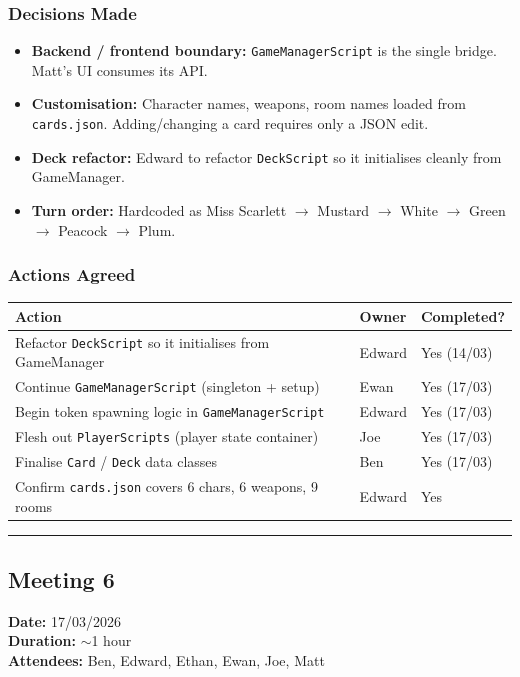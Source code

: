 \subsubsection*{Decisions Made}
\begin{itemize}
    \item \textbf{Backend / frontend boundary:} \texttt{GameManagerScript} is the single bridge. Matt's UI consumes its API.
    \item \textbf{Customisation:} Character names, weapons, room names loaded from \texttt{cards.json}. Adding/changing a card requires only a JSON edit.
    \item \textbf{Deck refactor:} Edward to refactor \texttt{DeckScript} so it initialises cleanly from GameManager.
    \item \textbf{Turn order:} Hardcoded as Miss Scarlett $\rightarrow$ Mustard $\rightarrow$ White $\rightarrow$ Green $\rightarrow$ Peacock $\rightarrow$ Plum.
\end{itemize}

\subsubsection*{Actions Agreed}
\begin{table}[H]
\centering
\begin{tabular}{|p{8cm}|l|l|}
\hline
\textbf{Action} & \textbf{Owner} & \textbf{Completed?} \\ \hline
Refactor \texttt{DeckScript} so it initialises from GameManager & Edward & Yes (14/03) \\ \hline
Continue \texttt{GameManagerScript} (singleton + setup) & Ewan & Yes (17/03) \\ \hline
Begin token spawning logic in \texttt{GameManagerScript} & Edward & Yes (17/03) \\ \hline
Flesh out \texttt{PlayerScripts} (player state container) & Joe & Yes (17/03) \\ \hline
Finalise \texttt{Card} / \texttt{Deck} data classes & Ben & Yes (17/03) \\ \hline
Confirm \texttt{cards.json} covers 6 chars, 6 weapons, 9 rooms & Edward & Yes \\ \hline
\end{tabular}
\end{table}

\smallskip
\hrule
\smallskip

\subsection{Meeting 6}
\textbf{Date:} 17/03/2026 \\
\textbf{Duration:} $\sim$1 hour \\
\textbf{Attendees:} Ben, Edward, Ethan, Ewan, Joe, Matt

